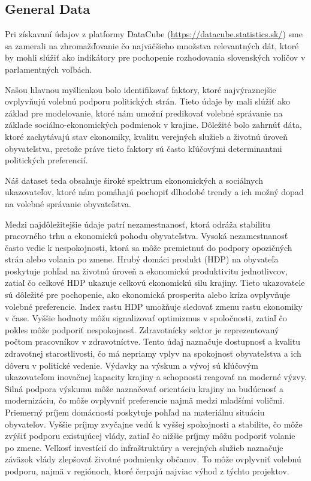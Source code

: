 \documentclass[main.tex]{subfiles}
\begin{document}
	
\subsection{General Data}	
	
Pri získavaní údajov z platformy DataCube (\url{https://datacube.statistics.sk/}) sme sa zamerali na zhromažďovanie čo najväčšieho množstva relevantných dát, ktoré by mohli slúžiť ako indikátory pre pochopenie rozhodovania slovenských voličov v parlamentných voľbách. 

Našou hlavnou myšlienkou bolo identifikovať faktory, ktoré najvýraznejšie ovplyvňujú volebnú podporu politických strán. Tieto údaje by mali slúžiť ako základ pre modelovanie, ktoré nám umožní predikovať volebné správanie na základe sociálno-ekonomických podmienok v krajine. 
Dôležité bolo zahrnúť dáta, ktoré zachytávajú stav ekonomiky, kvalitu verejných služieb a životnú úroveň obyvateľstva, pretože práve tieto faktory sú často kľúčovými determinantmi politických preferencií.

Náš dataset teda obsahuje široké spektrum ekonomických a sociálnych ukazovateľov, ktoré nám pomáhajú pochopiť dlhodobé trendy a ich možný dopad na volebné správanie obyvateľstva. 

Medzi najdôležitejšie údaje patrí nezamestnanosť, ktorá odráža stabilitu pracovného trhu a ekonomickú pohodu obyvateľstva. Vysoká nezamestnanosť často vedie k nespokojnosti, ktorá sa môže premietnuť do podpory opozičných strán alebo volania po zmene.
Hrubý domáci produkt (HDP) na obyvateľa poskytuje pohľad na životnú úroveň a ekonomickú produktivitu jednotlivcov, zatiaľ čo celkové HDP ukazuje celkovú ekonomickú silu krajiny. 
Tieto ukazovatele sú dôležité pre pochopenie, ako ekonomická prosperita alebo kríza ovplyvňuje volebné preferencie. 
Index rastu HDP umožňuje sledovať zmenu rastu ekonomiky v čase. Vyššie hodnoty môžu signalizovať optimizmus v spoločnosti, zatiaľ čo pokles môže podporiť nespokojnosť.
Zdravotnícky sektor je reprezentovaný počtom pracovníkov v zdravotníctve. Tento údaj naznačuje dostupnosť a kvalitu zdravotnej starostlivosti, čo má nepriamy vplyv na spokojnosť obyvateľstva a ich dôveru v politické vedenie. 
Výdavky na výskum a vývoj sú kľúčovým ukazovateľom inovačnej kapacity krajiny a schopnosti reagovať na moderné výzvy. Silná podpora výskumu môže naznačovať orientáciu krajiny na budúcnosť a modernizáciu, čo môže ovplyvniť preferencie najmä medzi mladšími voličmi.
Priemerný príjem domácností poskytuje pohľad na materiálnu situáciu obyvateľov. Vyššie príjmy zvyčajne vedú k vyššej spokojnosti a stabilite, čo môže zvýšiť podporu existujúcej vlády, zatiaľ čo nižšie príjmy môžu podporiť volanie po zmene.
Veľkosť investícií do infraštruktúry a verejných služieb naznačuje záväzok vlády zlepšovať životné podmienky občanov. To môže ovplyvniť volebnú podporu, najmä v regiónoch, ktoré čerpajú najviac výhod z týchto projektov.
\end{document}
